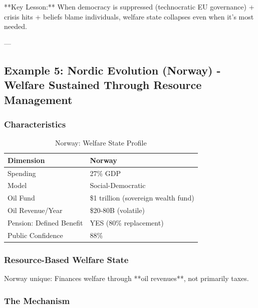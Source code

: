 **Key Lesson:** When democracy is suppressed (technocratic EU governance) + crisis hits + beliefs blame individuals, welfare state collapses even when it's most needed.

---

\subsection{Example 5: Nordic Evolution (Norway) - Welfare Sustained Through Resource Management}

\subsubsection{Characteristics}

\begin{table}[h]
\centering
\caption{Norway: Welfare State Profile}
\label{tab:norway-profile}
\begin{tabular}{ll}
\toprule
\textbf{Dimension} & \textbf{Norway} \\
\midrule
Spending & 27\% GDP \\
Model & Social-Democratic \\
Oil Fund & \$1 trillion (sovereign wealth fund) \\
Oil Revenue/Year & \$20-80B (volatile) \\
Pension: Defined Benefit & YES (80\% replacement) \\
Public Confidence & 88\% \\
\bottomrule
\end{tabular}
\end{table}

\subsubsection{Resource-Based Welfare State}

Norway unique: Finances welfare through **oil revenues**, not primarily taxes.

\subsubsection{The Mechanism}

